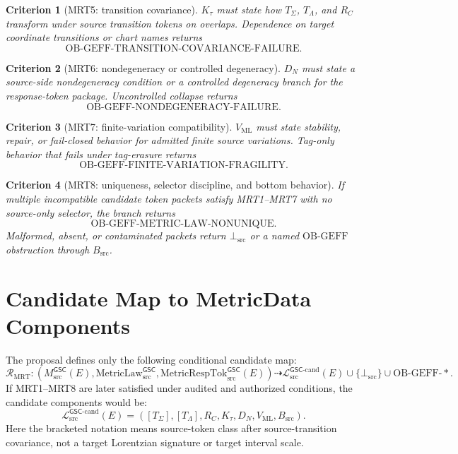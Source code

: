\documentclass[11pt]{article}
\newcommand{\MsrcGSC}{M_{\mathrm{src}}^{\mathsf{GSC}}}
\newcommand{\MetricLaw}{\mathrm{MetricLaw}_{\mathrm{src}}^{\mathsf{GSC}}}
\newcommand{\MetricRespTok}{\mathrm{MetricRespTok}_{\mathrm{src}}^{\mathsf{GSC}}}
\newcommand{\MetricDataCand}{\mathcal{L}_{\mathrm{src}}^{\mathsf{GSC}\mbox{-}\mathrm{cand}}}
\newcommand{\BottomSrc}{\bot_{\mathrm{src}}}
\newtheorem{criterion}{Criterion}
\begin{document}
\begin{criterion}[MRT5: transition covariance]
\(K_{\tau}\) must state how \(T_{\Sigma}\), \(T_{\Lambda}\), and \(R_C\)
transform under source transition tokens on overlaps. Dependence on target
coordinate transitions or chart names returns
\[
  \mathrm{OB\mbox{-}GEFF\mbox{-}TRANSITION\mbox{-}COVARIANCE\mbox{-}FAILURE}.
\]
\end{criterion}

\begin{criterion}[MRT6: nondegeneracy or controlled degeneracy]
\(D_N\) must state a source-side nondegeneracy condition or a controlled
degeneracy branch for the response-token package. Uncontrolled collapse
returns
\[
  \mathrm{OB\mbox{-}GEFF\mbox{-}NONDEGENERACY\mbox{-}FAILURE}.
\]
\end{criterion}

\begin{criterion}[MRT7: finite-variation compatibility]
\(V_{\mathrm{ML}}\) must state stability, repair, or fail-closed behavior for
admitted finite source variations. Tag-only behavior that fails under
tag-erasure returns
\[
  \mathrm{OB\mbox{-}GEFF\mbox{-}FINITE\mbox{-}VARIATION\mbox{-}FRAGILITY}.
\]
\end{criterion}

\begin{criterion}[MRT8: uniqueness, selector discipline, and bottom behavior]
If multiple incompatible candidate token packets satisfy MRT1--MRT7 with no
source-only selector, the branch returns
\[
  \mathrm{OB\mbox{-}GEFF\mbox{-}METRIC\mbox{-}LAW\mbox{-}NONUNIQUE}.
\]
Malformed, absent, or contaminated packets return \(\BottomSrc\) or a named
\(\mathrm{OB\mbox{-}GEFF}\) obstruction through \(B_{\mathrm{src}}\).
\end{criterion}

\section{Candidate Map to MetricData Components}

The proposal defines only the following conditional candidate map:
\[
  \mathcal{R}_{\mathrm{MRT}}:
  (\MsrcGSC(E),\MetricLaw,\MetricRespTok(E))
  \dashrightarrow
  \MetricDataCand(E)
  \cup
  \{\BottomSrc\}
  \cup
  \mathrm{OB\mbox{-}GEFF\mbox{-}*}.
\]
If MRT1--MRT8 are later satisfied under audited and authorized conditions, the
candidate components would be:
\[
  \MetricDataCand(E)
  =
  (
    [T_{\Sigma}],
    [T_{\Lambda}],
    R_C,
    K_{\tau},
    D_N,
    V_{\mathrm{ML}},
    B_{\mathrm{src}}
  ).
\]
Here the bracketed notation means source-token class after source-transition
covariance, not a target Lorentzian signature or target interval scale.
\end{document}
